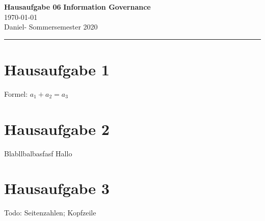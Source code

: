 \documentclass[
    a4paper,
    11pt,
    notitlepage,
    parskip=half,
    egregdoesnotlikesansseriftitles
]{scrartcl}
\title{\aufgabe}
\subtitle{\modul}
\author{\name}
\date{\datum}
\newcommand{\aufgabe}{Hausaufgabe 06}
\newcommand{\modul}{Information Governance}
\newcommand{\sem}{Sommersemester 2020}
\newcommand{\name}{Daniel}
\newcommand{\matrk}{}
\newcommand{\uni}{}
\newcommand{\datum}{\today}
\begin{document}
\thispagestyle{scrplain}

\Large\textbf{\aufgabe} \hfill \textbf{\modul} \\
\normalsize
\datum \hfill \uni \\
\name \space - \space \matrk \hfill \sem \\
\rule{\textwidth}{0.1mm}



\section{Hausaufgabe 1}

Formel: $ a_1 + a_2 = a_3 $

\newpage

\section{Hausaufgabe 2}

Blabllbalbasfasf Hallo

\newpage

\section{Hausaufgabe 3}

Todo: Seitenzahlen; Kopfzeile

\end{document}
